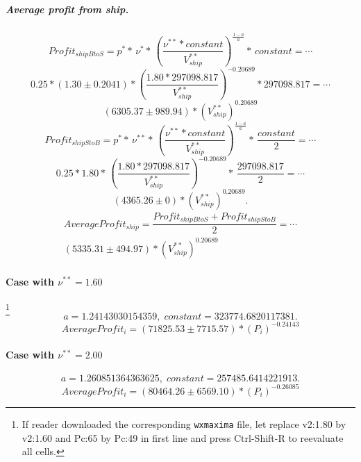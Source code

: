 \documentclass[]{article}
\begin{document}
 \subparagraph{Average profit from ship.}
  \[Profit_{shipBtoS}=p^{*}*\,\nu^{*}*\,\left( \dfrac{\nu^{**}*constant}{V^{**}_{ship}}\right)^{\frac{1-a}{a}}*\, constant=\cdots\]
  \[0.25*(1.30\pm0.2041)*\left( \dfrac{1.80*297098.817}{V^{**}_{ship}}\right)^{-0.20689}*297098.817=\cdots\]
  \[(6305.37\pm989.94)*(V^{**}_{ship})^{0.20689}\]  
   \[Profit_{shipStoB}=p^{*}*\,\nu^{**}*\,\left( \dfrac{\nu^{**}*constant}{V^{**}_{ship}}\right)^{\frac{1-a}{a}}*\, \dfrac{constant}{2}=\cdots\]
    \[0.25*1.80*\,\left( \dfrac{1.80*297098.817}{V^{**}_{ship}}\right)^{-0.20689}*\, \dfrac{297098.817}{2}=\cdots\]
    \[(4365.26\pm0)*(V^{**}_{ship})^{0.20689}.\]
    \begin{equation}\label{eq:avgProfitShip}
    	\begin{split}
    AverageProfit_{ship}=\dfrac{Profit_{shipBtoS}+Profit_{shipStoB}}{2}=\cdots\\
    (5335.31\pm494.97)*(V^{**}_{ship})^{0.20689}
    	\end{split}
    \end{equation}
    
\paragraph{Case with $\nu^{**}=1.60$}\footnote{If reader downloaded the corresponding \texttt{wxmaxima} file, let replace v2:1.80 by v2:1.60 and Pc:65 by Pc:49 in first line and press Ctrl-Shift-R to reevaluate all cells.}
\[a=1.24143030154359,\;constant=323774.6820117381.\]
\[AverageProfit_{i}=(71825.53\pm7715.57)*(P_{i})^{-0.24143}\]

\paragraph{Case with $\nu^{**}=2.00$}
\[a=1.260851364363625,\;constant=257485.6414221913.\]
\[AverageProfit_{i}=(80464.26\pm6569.10)*(P_{i})^{-0.26085}\]
\end{document}
